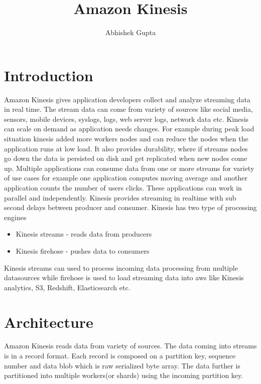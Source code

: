\documentclass[9pt,twocolumn,twoside]{../../styles/osajnl}
\title{Amazon Kinesis}
\author[1,*]{Abhishek Gupta}
\affil[1]{School of Informatics and Computing, Bloomington, IN 47408, U.S.A.}
\affil[*]{Corresponding authors: abhigupt@iu.edu}
\begin{document}
\maketitle

\section{Introduction}

Amazon Kinesis \cite{www-kinesis} gives application developers collect and analyze streaming data in real time. The stream data can come from variety of sources like social media, sensors, mobile devices, syslogs, logs, web server logs, network data etc. Kinesis can scale on demand as application needs changes. For example during peak load situation kinesis added more workers nodes and can reduce the nodes when the application runs at low load. It also provides durability, where if streams nodes go down the data is persisted on disk and get replicated when new nodes come up. Multiple applications can consume data from one or more streams for variety of use cases for example one application computes moving average and another application counts the number of users clicks. These applications can work in parallel and independently. Kinesis provides streaming in realtime with sub second delays between producer and consumer. Kinesis has two type of processing engines
\begin{itemize}
	\item Kinesis streams - reads data from producers
	\item Kinesis firehose - pushes data to consumers
\end{itemize}

Kinesis streams can used to process incoming data processing from multiple datasources while firehose is used to load streaming data into aws like Kinesis analytics, S3, Redshift, Elasticsearch etc.

\section{Architecture} 
Amazon Kinesis reads data from variety of sources. The data coming into streams is in a record format. Each record is composed on a partition key, sequence number and data blob which is raw serialized byte array. The data further is partitioned into multiple workers(or shards) using the incoming partition key. 
\end{document}
